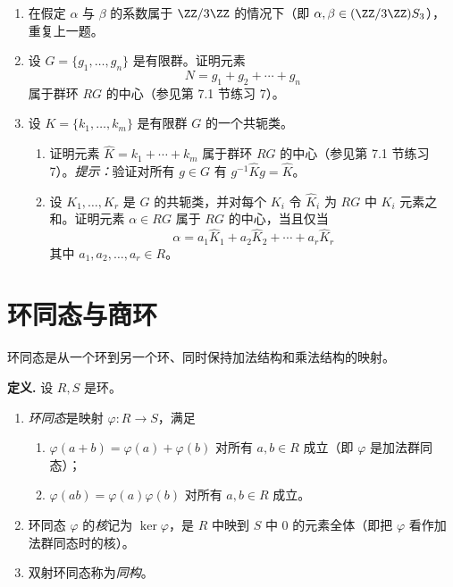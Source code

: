 \begin{enumerate}[label=\arabic*.]
\begin{enumerate}[label=(\alph*)]
		\item $\alpha\beta$；
		\item $\beta\alpha$；
		\item $\alpha^2$。
	\end{enumerate}
	\item 在假定 $\alpha$ 与 $\beta$ 的系数属于 $\ZZ/3\ZZ$ 的情况下（即 $\alpha,\beta\in(\ZZ/3\ZZ)S_3$），重复上一题。
	\item 设 $G=\{g_1,\ldots,g_n\}$ 是有限群。证明元素
	\[
	N=g_1+g_2+\cdots+g_n
	\]
	属于群环 $RG$ 的中心（参见第 7.1 节练习 7）。
	\item 设 $K=\{k_1,\ldots,k_m\}$ 是有限群 $G$ 的一个共轭类。
	\begin{enumerate}[label=(\alph*)]
		\item 证明元素 $\widehat K=k_1+\cdots+k_m$ 属于群环 $RG$ 的中心（参见第 7.1 节练习 7）。\emph{提示：}验证对所有 $g\in G$ 有 $g^{-1}\widehat K g=\widehat K$。
		\item 设 $K_1,
		\ldots,K_r$ 是 $G$ 的共轭类，并对每个 $K_i$ 令 $\widehat K_i$ 为 $RG$ 中 $K_i$ 元素之和。证明元素 $\alpha\in RG$ 属于 $RG$ 的中心，当且仅当
		\[
		\alpha=a_1\widehat K_1+a_2\widehat K_2+\cdots+a_r\widehat K_r
		\]
		其中 $a_1,a_2,\ldots,a_r\in R$。
	\end{enumerate}
\end{enumerate}



\section{环同态与商环}

环同态是从一个环到另一个环、同时保持加法结构和乘法结构的映射。

\medskip
\noindent\textbf{定义.} 设 $R,S$ 是环。
\begin{enumerate}[label=(\arabic*)]
  \item \emph{环同态}是映射 $\varphi:R\to S$，满足
  \begin{enumerate}[label=(\roman*)]
    \item $\varphi(a+b)=\varphi(a)+\varphi(b)$ 对所有 $a,b\in R$ 成立（即 $\varphi$ 是加法群同态）；
    \item $\varphi(ab)=\varphi(a)\varphi(b)$ 对所有 $a,b\in R$ 成立。
  \end{enumerate}
  \item 环同态 $\varphi$ 的\emph{核}记为 $\ker\varphi$，是 $R$ 中映到 $S$ 中 $0$ 的元素全体（即把 $\varphi$ 看作加法群同态时的核）。
  \item 双射环同态称为\emph{同构}。
\end{enumerate}

